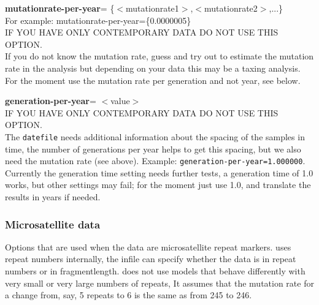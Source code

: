 \begin{description}
\item{\bf mutationrate-per-year}= \{$<$mutationrate1$>$,$<$mutationrate2$>$,...\}  \\
For example: mutationrate-per-year=\{0.0000005\}\\
IF YOU HAVE ONLY CONTEMPORARY DATA DO NOT USE THIS OPTION.\\
If you do not know the mutation rate, guess and try out to estimate the mutation rate in the analysis but depending on your data this may be a taxing analysis. For the moment use the mutation rate per generation and not year, see below.

\item{\bf generation-per-year}= $<$value$>$ \\
IF YOU HAVE ONLY CONTEMPORARY DATA DO NOT USE THIS OPTION.\\
The {\tt datefile} needs additional information about the spacing of the samples in time, the number of generations per year helps to get this spacing, but we also need the mutation rate (see above). 
Example: {\tt generation-per-year=1.000000}. Currently the generation time setting needs further tests, a generation time of 1.0 works, but other settings may fail; for the moment just use 1.0, and translate the results in years if needed.

\end{description}


\subsubsection{Microsatellite data}
Options that are used when the data are microsatellite repeat markers. \migrate uses repeat numbers internally, the infile can specify whether the data is in repeat numbers or in fragmentlength.
\migrate does not use models that behave differently with very small or very large numbers of repeats, It assumes that the mutation rate for a change from, say, 5 repeats to 6 is the same as from 245 to 246. 

